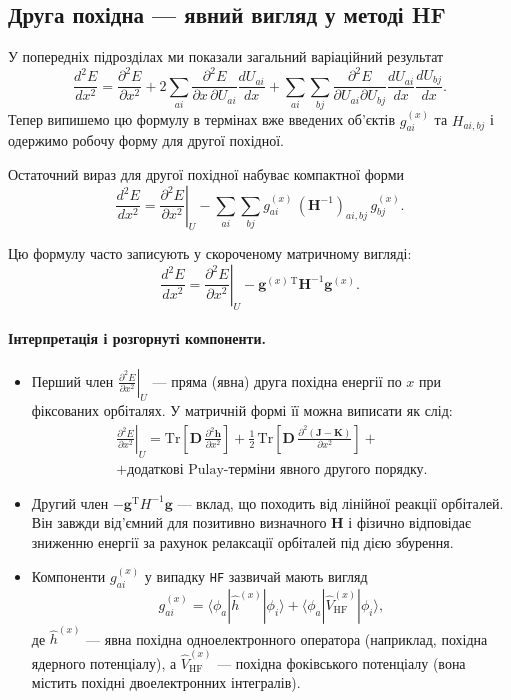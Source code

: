 \documentclass{PySCFBook}
\begin{document}
\subsection{Друга похідна — явний вигляд у методі HF}

У попередніх підрозділах ми показали загальний варіаційний результат
\[
\frac{d^2E}{dx^2}
=
\frac{\partial^2 E}{\partial x^2}
+2\sum_{ai}\frac{\partial^2 E}{\partial x\,\partial U_{ai}}\frac{dU_{ai}}{dx}
+\sum_{ai}\sum_{bj}\frac{\partial^2 E}{\partial U_{ai}\partial U_{bj}}
\frac{dU_{ai}}{dx}\frac{dU_{bj}}{dx}.
\]
Тепер випишемо цю формулу в термінах вже введених об'єктів
$g^{(x)}_{ai}$ та $H_{ai,bj}$ і одержимо робочу форму для другої похідної.


Остаточний вираз для другої похідної набуває компактної форми
\begin{equation}\label{eq:d2E_final_boxed}
\displaystyle
\frac{d^2E}{dx^2}
=
\left.\frac{\partial^2 E}{\partial x^2}\right|_{U}
-
\sum_{ai}\sum_{bj}
g^{(x)}_{ai}\,(\mathbf{H}^{-1})_{ai,bj}\,g^{(x)}_{bj}.
\end{equation}

Цю формулу часто записують у скороченому матричному вигляді:
\[
\frac{d^2E}{dx^2} = \left.\frac{\partial^2 E}{\partial x^2}\right|_{U} - \mathbf g^{(x)\,\mathrm T} \mathbf{H}^{-1}\mathbf g^{(x)}.
\]

\paragraph{Інтерпретація і розгорнуті компоненти.}
\begin{itemize}
    \item Перший член $\displaystyle\left.\frac{\partial^2 E}{\partial x^2}\right|_{U}$ — пряма (явна) друга похідна енергії по $x$ при фіксованих орбіталях. У матричній формі її можна виписати як слід:
\begin{multline*}
    \left.\frac{\partial^2 E}{\partial x^2}\right|_{U}
    =
    \mathrm{Tr}\!\left[\mathbf D\,\frac{\partial^2\mathbf h}{\partial x^2}\right]
    +\tfrac12\,\mathrm{Tr}\!\left[\mathbf D\,\frac{\partial^2(\mathbf J-\mathbf K)}{\partial x^2}\right]
    + \\ +\text{додаткові Pulay-терміни явного другого порядку}.
\end{multline*}
    \item Другий член $-\mathbf g^{\mathrm T} H^{-1}\mathbf g$ — вклад, що походить від лінійної реакції орбіталей. Він завжди від'ємний для позитивно визначного $\mathbf H$ і фізично відповідає зниженню енергії за рахунок релаксації орбіталей під дією збурення.
    \item Компоненти $g^{(x)}_{ai}$ у випадку \texttt{HF} зазвичай мають вигляд
    \[
    g^{(x)}_{ai} = \langle \phi_a | \hat h^{(x)} | \phi_i \rangle
    + \langle \phi_a | \hat V^{(x)}_\text{HF} | \phi_i \rangle,
    \]
    де $\hat h^{(x)}$ — явна похідна одноелектронного оператора (наприклад, похідна ядерного потенціалу), а $\hat V^{(x)}_\text{HF}$ — похідна фоківського потенціалу (вона містить похідні двоелектронних інтегралів).
\end{itemize}
\end{document}
